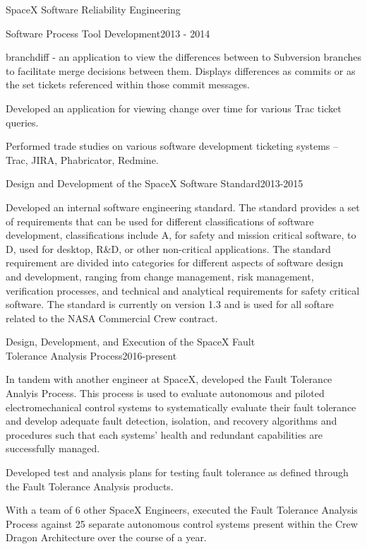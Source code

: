 \documentclass{resume} %
\begin{document}
\begin{rSection}{SpaceX Software Reliability Engineering}
\begin{rSubsection}{Software Process Tool Development}{2013 - 2014}{}{}
\item branchdiff - an application to view the differences between to Subversion
  branches to facilitate merge decisions between them. Displays differences as
  commits or as the set tickets referenced within those commit messages.
\item Developed an application for viewing change over time for various Trac
  ticket queries.
\item Performed trade studies on various software development ticketing systems
  -- Trac, JIRA, Phabricator, Redmine.

\end{rSubsection}




\begin{rSubsection}{Design and Development of the SpaceX Software Standard}{2013-2015}{}{}

\item Developed an internal software engineering standard. The standard provides
  a set of requirements that can be used for different classifications of
  software development, classifications include A, for safety and mission
  critical software, to D, used for desktop, R\&D, or other non-critical
  applications. The standard requirement are divided into categories for
  different aspects of software design and development, ranging from change
  management, risk management, verification processes, and technical and
  analytical requirements for safety critical software. The standard is
  currently on version 1.3 and is used for all softare related to the NASA
  Commercial Crew contract.

\end{rSubsection}


\begin{rSubsection}{Design, Development, and Execution of the SpaceX Fault\\
    Tolerance Analysis Process}{2016-present}{}

\item In tandem with another engineer at SpaceX, developed the Fault Tolerance
  Analyis Process. This process is used to evaluate autonomous and piloted
  electromechanical control systems to systematically evaluate their fault
  tolerance and develop adequate fault detection, isolation, and recovery
  algorithms and procedures such that each systems' health and redundant
  capabilities are successfully managed.
\item Developed test and analysis plans for testing fault tolerance as defined
  through the Fault Tolerance Analysis products.
\item With a team of 6 other SpaceX Engineers, executed the Fault Tolerance
  Analysis Process against 25 separate autonomous control systems present
  within the Crew Dragon Architecture over the course of a year.


\end{rSubsection}
\end{rSection}
\end{document}
